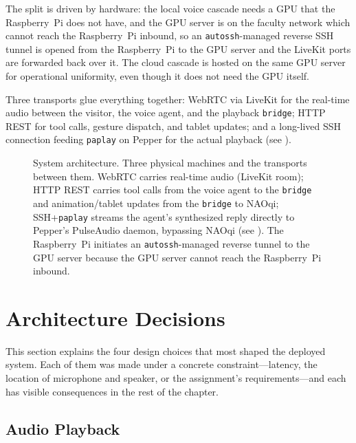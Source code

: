 The split is driven by hardware: the local voice cascade needs a GPU that the Raspberry~Pi does not have, and the GPU server is on the faculty network which cannot reach the Raspberry~Pi inbound, so an \texttt{autossh}-managed reverse SSH tunnel is opened from the Raspberry~Pi to the GPU server and the LiveKit ports are forwarded back over it.
The cloud cascade is hosted on the same GPU server for operational uniformity, even though it does not need the GPU itself.

Three transports glue everything together: WebRTC via LiveKit for the real-time audio between the visitor, the voice agent, and the playback \texttt{bridge}; HTTP REST for tool calls, gesture dispatch, and tablet updates; and a long-lived SSH connection feeding \texttt{paplay} on Pepper for the actual playback (see ).

\begin{figure}[h]
    \centering
    
    \caption{System architecture. Three physical machines and the transports between them. WebRTC carries real-time audio (LiveKit room); HTTP REST carries tool calls from the voice agent to the \texttt{bridge} and animation/tablet updates from the \texttt{bridge} to NAOqi; SSH+\texttt{paplay} streams the agent's synthesized reply directly to Pepper's PulseAudio daemon, bypassing NAOqi (see ). The Raspberry~Pi initiates an \texttt{autossh}-managed reverse tunnel to the GPU server because the GPU server cannot reach the Raspberry~Pi inbound.}
    \label{fig:architecture}
\end{figure}


\section{Architecture Decisions}
\label{sec:arch_decisions}

This section explains the four design choices that most shaped the deployed system.
Each of them was made under a concrete constraint---latency, the location of microphone and speaker, or the assignment's requirements---and each has visible consequences in the rest of the chapter.

\subsection{Audio Playback}
\label{sec:dec_audio}

